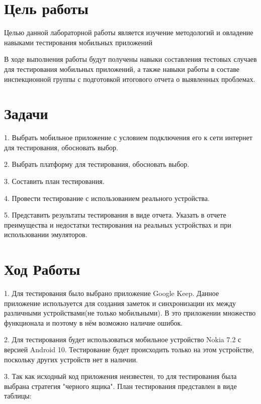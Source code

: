 \documentclass[12pt]{article}
\begin{document}
    \section*{Цель работы}

    Целью данной лабораторной работы является изучение методологий и овладение навыками тестирования мобильных приложений

    В ходе выполнения работы будут получены навыки составления тестовых случаев для тестирования мобильных приложений, а также навыки работы в составе инспекционной группы с подготовкой итогового отчета о выявленных проблемах.

    \section*{Задачи}

    1. Выбрать мобильное приложение с условием подключения его к сети интернет для тестирования, обосновать выбор.

    2. Выбрать платформу для тестирования, обосновать выбор.

    3. Составить план тестирования.

    4. Провести тестирование с использованием реального устройства.

    5. Представить результаты тестирования в виде отчета. Указать в отчете преимущества и недостатки тестирования на реальных устройствах и при использовании эмуляторов.

    \section*{Ход Работы}
    1. Для тестирования было выбрано приложение Google Keep. Данное приложение используется для создания заметок и синхронизации их между различными устройствами(не только мобильными). В это приложении множество функционала и поэтому в нём возможно наличие ошибок.

    2. Для тестирования будет использоваться мобильное устройство Nokia 7.2 с версией Android 10. Тестирование будет происходить только на этом устройстве, поскольку других устройств нет в наличии.

    \newpage

    3. Так как исходный код приложения неизвестен, то для тестирования была выбрана стратегия "черного ящика". План тестирования представлен в виде таблицы:
\end{document}

